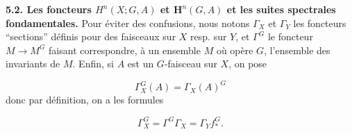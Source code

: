 \bigskip
\textbf{5.2. Les foncteurs $H^n(X;G,A)$ et $\mathbf H^n(G,A)$ et les suites
spectrales fondamentales.}
Pour éviter des confusions, nous notons $\Gamma_X$ et $\Gamma_Y$ les foncteurs
``sections'' définis pour des faisceaux sur $X$ resp. sur $Y$, et $\Gamma^G$
le foncteur $M\to M^G$ faisant correspondre, à un ensemble $M$ où
opère $G$, l'ensemble des invariants de $M$. Enfin, si $A$ est un $G$-faisceau
sur $X$, on pose

\[
\Gamma_X^G(A)=\Gamma_X(A)^G
\tag{5.2.1}
\]
donc par définition, on a les formules

\[
\Gamma_X^G=\Gamma^G\Gamma_X=\Gamma_Yf_*^G.
\tag{5.2.2}
\]


